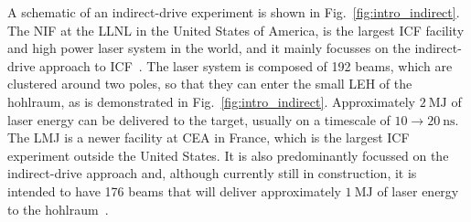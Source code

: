 A schematic of an indirect-drive experiment is shown in Fig.~\ref{fig:intro_indirect}.
The \ac{NIF} at the \ac{LLNL} in the United States of America, is the largest \ac{ICF} facility and high power laser system in the world, and it mainly focusses on the indirect-drive approach to \ac{ICF}~\cite{miller_national_2004,spaeth_description_2016}.
The laser system is composed of 192 beams, which are clustered around two poles, so that they can enter the small \ac{LEH} of the hohlraum, as is demonstrated in Fig.~\ref{fig:intro_indirect}.
Approximately $2\ \text{MJ}$ of laser energy can be delivered to the target, usually on a timescale of $10\rightarrow20\ \text{ns}$.
The \ac{LMJ} is a newer facility at \ac{CEA} in France, which is the largest \ac{ICF} experiment outside the United States.
It is also predominantly focussed on the indirect-drive approach and, although currently still in construction, it is intended to have 176 beams that will deliver approximately $1\ \text{MJ}$ of laser energy to the hohlraum~\cite{fleurot_laser_2005}.

